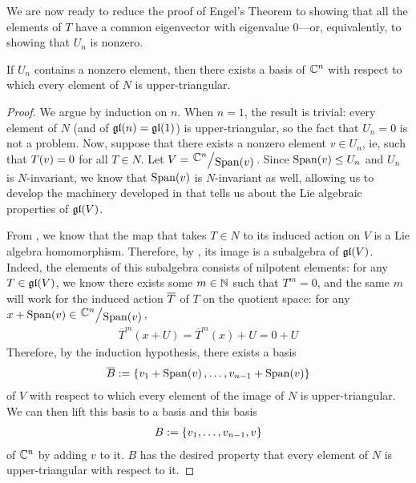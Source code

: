 We are now ready to reduce the proof of Engel's Theorem to showing that all the elements of $T$ have a common eigenvector with eigenvalue $0$---or, equivalently, to showing that $U_n$ is nonzero.

\begin{lemma}
    If $U_n$ contains a nonzero element, then there exists a basis of $\mathbb{C}^n$ with respect to which every element of $N$ is upper-triangular.
\end{lemma}
\begin{proof}
    We argue by induction on $n$. When $n = 1$, the result is trivial: every element of $N$ (and of $\mathfrak{gl}\!\left( n \right) = \mathfrak{gl}\!\left( 1 \right)$) is upper-triangular, so the fact that $U_n = 0$ is not a problem. Now, suppose that there exists a nonzero element $v \in U_n$, ie, such that $T\!\left( v \right) = 0$ for all $T \in N$. Let $V = \quotient{\C^n}{\Span{v}}$. Since $\operatorname{Span}\!\left( v \right) \leq U_n$ and $U_n$ is $N$-invariant, we know that $\operatorname{Span}\!\left( v \right)$ is $N$-invariant as well, allowing us to develop the machinery developed in  that tells us about the Lie algebraic properties of $\mathfrak{gl}\!\left( V \right)$.
    
    From , we know that the map that takes $T \in N$ to its induced action on $V$ is a Lie algebra homomorphism. Therefore, by , its image is a subalgebra of $\mathfrak{gl}\!\left( V \right)$. Indeed, the elements of this subalgebra consists of nilpotent elements: for any $T \in \mathfrak{gl}\!\left( V \right)$, we know there exists some $m \in \mathbb{N}$ such that $T^m = 0$, and the same $m$ will work for the induced action $\overline{T}$ of $T$ on the quotient space: for any $x + \Span{v} \in \quotient{\C^n}{\Span{v}}$,
    \begin{align*}
        \overline{T}^m(x + U) = \overline{T}^m(x) + U = 0 + U
    \end{align*}
    Therefore, by the induction hypothesis, there exists a basis
    \begin{align*}
        \overline{B} := \left\{ v_1 + \operatorname{Span}\!\left( v \right), \ldots, v_{n - 1} + \operatorname{Span}\!\left( v \right) \right\}
    \end{align*}
    of $V$ with respect to which every element of the image of $N$ is upper-triangular. We can then lift this basis to a basis and this basis
    \begin{align*}
        B := \left\{ v_1, \ldots, v_{n - 1}, v \right\}
    \end{align*}
    of $\mathbb{C}^n$ by adding $v$ to it. $B$ has the desired property that every element of $N$ is upper-triangular with respect to it.
\end{proof}

